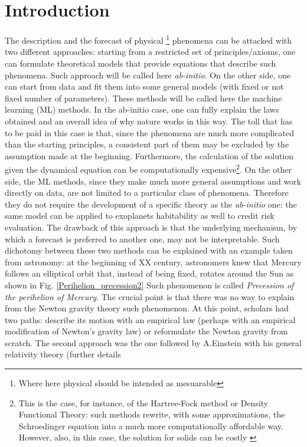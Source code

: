 \documentclass[12pt,%
               a4paper,%
               oneside,openany,%
               titlepage,%
               headinclude,footinclude,%
               BCOR5mm,%
               cleardoublepage=empty,%
               tablecaptionabove,%
               floatperchapter,
               ]{scrreprt}                 %
\begin{document}
\tableofcontents %

\newpage %



\newpage

\chapter{Introduction} The description and the forecast of physical \footnote{Where here physical should be intended as mesuarable} phenomena can be attacked with two different approaches: starting from a restricted set of principles/axioms, one can formulate theoretical models that provide equations that describe such phenomena. Such approach will be called here \textit{ab-initio}. On the other side, one can start from data and fit them into some general models (with fixed or not fixed number of parameters). These methods will be called here the machine learning (ML) methods. In the ab-initio case, one can fully explain the laws obtained and an overall idea of why nature works in this way. The toll that has to be paid in this case is that, since the phenomena are much more complicated than the starting principles, a consistent part of them may be excluded by the assumption made at the beginning. Furthermore, the calculation of the solution given the dynamical equation can be computationally expensive\footnote{This is the case, for instance, of the Hartree-Fock method or Density Functional Theory: such methods rewrite, with some approximations, the Schroedinger equation into a much more computationally affordable way. However, also, in this case, the solution for solids can be costly \cite{martin_2004}}. On the other side, the ML methods, since they make much more general assumptions and work directly on data, are not limited to a particular class of phenomena. Therefore they do not require the development of a specific theory as the \textit{ab-initio} one: the same model can be applied to exoplanets habitability as well to credit risk evaluation. The drawback of this approach is that the underlying mechanism,  by which a forecast is preferred to another one, may not be interpretable. Such dichotomy between these two methods can be explained with an example taken from astronomy: at the beginning of XX century, astronomers knew that Mercury follows an elliptical orbit that, instead of being fixed, rotates around the Sun as shown in Fig. \ref{Perihelion_precession2} Such phenomenon is called \textit{Precession of the perihelion of Mercury}. The crucial point is that there was no way to explain from the Newton gravity theory such phenomenon. At this point, scholars had two paths: describe its motion with an empirical law (perhaps with an empirical modification of Newton's gravity law) or reformulate the Newton gravity from scratch. The second approach was the one followed by A.Einstein with his general relativity theory (further details 
\end{document}
